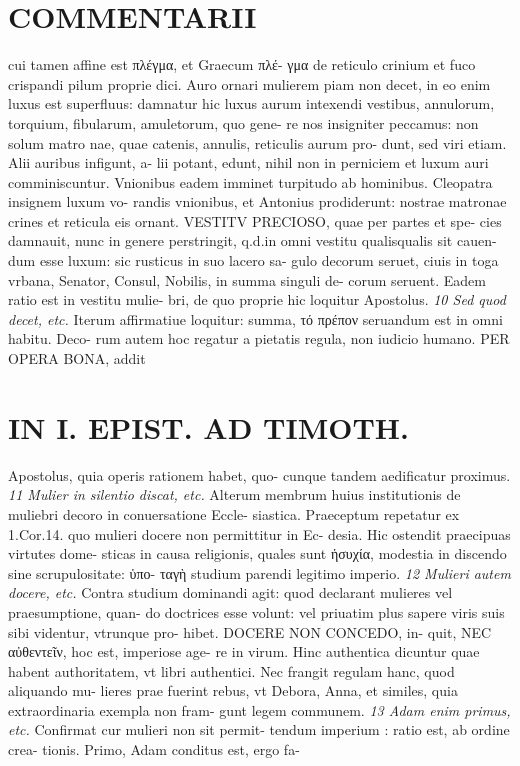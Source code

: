 \documentclass{article}
\begin{document}
\begin{pages}
\section*{COMMENTARII }\pstart cui tamen affine est πλέγμα, et Graecum πλέ- γμα de reticulo crinium et fuco crispandi pilum proprie dici.  \pend\pstart Auro ornari mulierem piam non decet, in eo enim luxus est superfluus: damnatur hic luxus aurum intexendi vestibus, annulorum, torquium, fibularum, amuletorum, quo gene- re nos insigniter peccamus: non solum matro nae, quae catenis, annulis, reticulis aurum pro- dunt, sed viri etiam. Alii auribus infigunt, a- lii potant, edunt, nihil non in perniciem et luxum auri comminiscuntur.  \pend\pstart Vnionibus eadem imminet turpitudo ab hominibus. Cleopatra insignem luxum vo- randis vnionibus, et Antonius prodiderunt: nostrae matronae crines et reticula eis ornant. VESTITV PRECIOSO, quae per partes et spe- cies damnauit, nunc in genere perstringit, q.d.in omni vestitu qualisqualis sit cauen- dum esse luxum: sic rusticus in suo lacero sa- gulo decorum seruet, ciuis in toga vrbana, Senator, Consul, Nobilis, in summa singuli de- corum seruent. Eadem ratio est in vestitu mulie- bri, de quo proprie hic loquitur Apostolus.  \pend
\textit{10 Sed quod decet, etc. }\pstart Iterum affirmatiue loquitur: summa, τό πρέπον seruandum est in omni habitu. Deco- rum autem hoc regatur a pietatis regula, non iudicio humano. PER OPERA BONA, addit  \pend
\section*{IN I. EPIST. AD TIMOTH. }
\marginpar{[ p.57 ]}\pstart Apostolus, quia operis rationem habet, quo- cunque tandem aedificatur proximus.  \pend
\textit{11 Mulier in silentio discat, etc. }\pstart Alterum membrum huius institutionis de muliebri decoro in conuersatione Eccle- siastica. Praeceptum repetatur ex 1.Cor.14. quo mulieri docere non permittitur in Ec- desia. Hic ostendit praecipuas virtutes dome- sticas in causa religionis, quales sunt ἡσυχία, modestia in discendo sine scrupulositate: ὑπο- ταγὴ studium parendi legitimo imperio.  \pend
\textit{12 Mulieri autem docere, etc. }\pstart Contra studium dominandi agit: quod declarant mulieres vel praesumptione, quan- do doctrices esse volunt: vel priuatim plus sapere viris suis sibi videntur, vtrunque pro- hibet. DOCERE NON CONCEDO, in- quit, NEC αὐθεντεῖν, hoc est, imperiose age- re in virum. Hinc authentica dicuntur quae habent authoritatem, vt libri authentici. Nec frangit regulam hanc, quod aliquando mu- lieres prae fuerint rebus, vt Debora, Anna, et similes, quia extraordinaria exempla non fram- gunt legem communem.  \pend
\textit{13 Adam enim primus, etc. }\pstart Confirmat cur mulieri non sit permit- tendum imperium : ratio est, ab ordine crea- tionis. Primo, Adam conditus est, ergo fa-  \pend
\marginpar{[ p.58 ]}

\end{pages}
\end{document}
